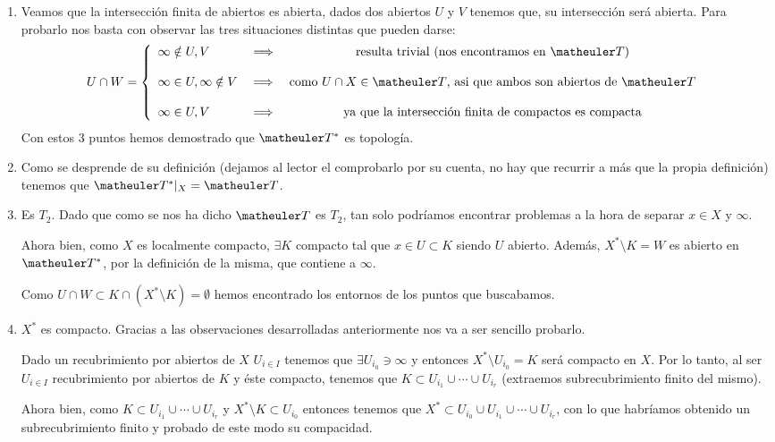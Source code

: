 \begin{obs}
\begin{enumerate}
		\item Veamos que la intersección finita de abiertos es abierta, dados dos abiertos $U$ y $V$ tenemos que, su intersección será abierta. Para probarlo nos basta con observar las tres situaciones distintas que pueden darse:
		\begin{equation}
		U\cap W=
		\left\{ \begin{array}{lcc}
		\infty\notin U,V &  \ra  & \textup{resulta trivial (nos encontramos en }\T)\\
		\\\infty\in U,\infty\notin V &   \ra  & \textup{como $U\cap X\in\T$, asi que ambos son abiertos de $\T$}\\
		\\\infty\in U,V &  \ra  & \textup{ya que la intersección finita de compactos es compacta}\\
		\end{array}
		\right.
		\end{equation}
		Con estos 3 puntos hemos demostrado que $\T^*$ es topología.
		\item Como se desprende de su definición (dejamos al lector el comprobarlo por su cuenta, no hay que recurrir a más que la propia definición) tenemos que $\T^*|_X=\T$. 
		\item Es $T_2$. Dado que como se nos ha dicho $\T$ es $T_2$, tan solo podríamos encontrar problemas a la hora de separar $x\in X$ y $\infty$.
		
		Ahora bien, como $X$ es localmente compacto, $\exists K$ compacto tal que $x\in U\subset K$ siendo $U$ abierto. Además, $X^*\setminus K=W$ es abierto en $\T^*$, por la definición de la misma, que contiene a $\infty$.
		
		Como $U\cap W\subset K\cap (X^*\setminus K)=\emptyset$ hemos encontrado los entornos de los puntos que buscabamos. 
		
		
		\item $X^*$ es compacto. Gracias a las observaciones desarrolladas anteriormente nos va a ser sencillo probarlo.
		
		Dado un recubrimiento por abiertos de $X$ $U_{i\in I}$ tenemos que $\exists U_{i_0}\ni\infty$ y entonces $X^*\setminus U_{i_0}=K$ será compacto en $X$. Por lo tanto, al ser $U_{i\in I}$ recubrimiento por abiertos de $K$ y éste compacto, tenemos que $K\subset U_{i_1}\cup\cdots\cup U_{i_r}$ (extraemos subrecubrimiento finito del mismo).
		
		Ahora bien, como $K\subset U_{i_1}\cup\cdots\cup U_{i_r}$ y $X^*\setminus K\subset U_{i_0}$ entonces tenemos que $X^*\subset U_{i_0}\cup  U_{i_1}\cup\cdots\cup U_{i_r}$, con lo que habríamos obtenido un subrecubrimiento finito y probado de este modo su compacidad.
		

\end{enumerate}
\end{obs}
